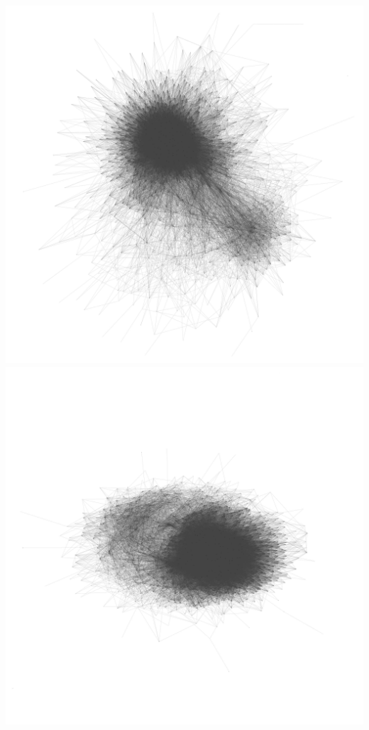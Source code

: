 \documentclass[12pt, a4paper]{article}
\begin{document}
\begin{multicols}{2}
{\centering
\includegraphics[width=\columnwidth]{src/youtube/hdg/hdg_simple}
\label{fig:hdg_simple}}
{\centering
\includegraphics[width=\columnwidth]{src/youtube/hdg/comp/5_plot_kk}\\
}
\end{multicols}
\end{document}
